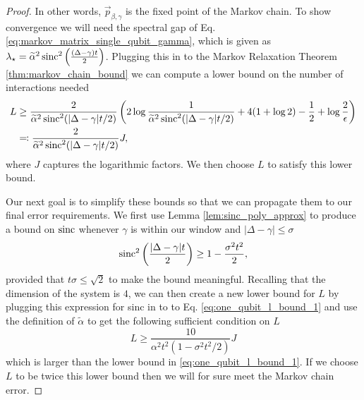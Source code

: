 \begin{proof}
 In other words, $\vec{p}_{\beta,\gamma}$ is the fixed point of the Markov chain. To show convergence we will need the spectral gap of Eq. \eqref{eq:markov_matrix_single_qubit_gamma}, which is given as $\lambda_{\star} = \widetilde{\alpha}^2 \operatorname{sinc}^2 \left( \frac{(\Delta - \gamma) t}{2} \right)$. Plugging this in to the Markov Relaxation Theorem \ref{thm:markov_chain_bound} we can compute a lower bound on the number of interactions needed 
 \begin{align}
     L &\ge \frac{2}{\widetilde{\alpha}^2 \operatorname{sinc}^2(|\Delta - \gamma|t/2)} \left( 2 \log \frac{1}{\widetilde{\alpha}^2 \operatorname{sinc}^2(|\Delta - \gamma|t/2)} + 4( 1 + \log 2) - \frac{1}{2} + \log \frac{2}{\epsilon} \right) \\
     &\eqqcolon \frac{2}{\widetilde{\alpha}^2 \operatorname{sinc}^2(|\Delta - \gamma| t/2)} J, \label{eq:one_qubit_l_bound_1}
 \end{align}
where $J$ captures the logarithmic factors.  We then choose $L$ to satisfy this lower bound.
 
 Our next goal is to simplify these bounds so that we can propagate them to our final error requirements. We first use Lemma \ref{lem:sinc_poly_approx} to produce a  bound on $\operatorname{sinc}$ whenever $\gamma$ is within our window and $|\Delta - \gamma| \le \sigma$
 \begin{align}
     \operatorname{sinc}^2\left( \frac{|\Delta - \gamma| t}{2} \right) \ge 1 - \frac{\sigma^2 t^2}{2},
 \end{align}
 provided that $t \sigma \le \sqrt{2}$ to make the bound meaningful. Recalling that the dimension of the system is $4$, we can then create a new lower bound for $L$ by plugging this expression for sinc in to to Eq. \eqref{eq:one_qubit_l_bound_1} and use  the definition of $\tilde{\alpha}$ to get the following sufficient condition on $L$
 \begin{equation}
     L \ge \frac{10}{\alpha^2 t^2(1 - \sigma^2 t^2 / 2)} J \label{eq:single_qubit_l_bound_2}
 \end{equation} which is larger than the lower bound in \eqref{eq:one_qubit_l_bound_1}. If we choose $L$ to be twice this lower bound then we will for sure meet the Markov chain error.   
 

\end{proof}
